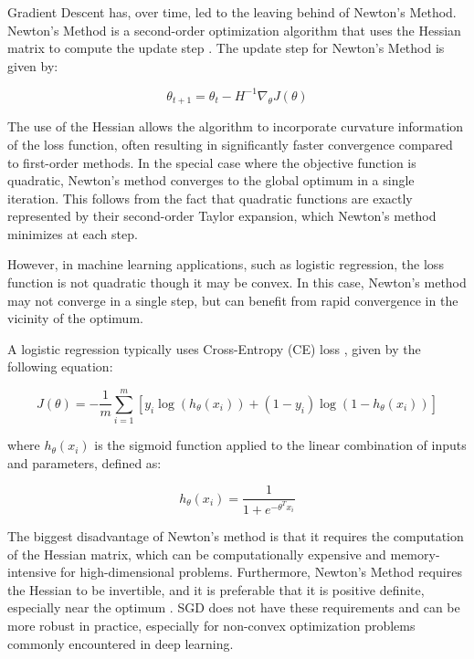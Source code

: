 \documentclass[conference]{IEEEtran}
\begin{document}
Gradient Descent has, over time, led to the leaving behind of Newton's Method. Newton's Method is a second-order optimization algorithm that uses the Hessian matrix to compute the update step \cite{POLYAK20071086}. The update step for Newton's Method is given by:

\begin{equation}
    \theta_{t+1} = \theta_t - H^{-1} \nabla_\theta J(\theta)
    \label{eq:newton}
\end{equation}

The use of the Hessian allows the algorithm to incorporate curvature information of the loss function, often resulting in significantly faster convergence compared to first-order methods. In the special case where the objective function is quadratic, Newton’s method converges to the global optimum in a single iteration. This follows from the fact that quadratic functions are exactly represented by their second-order Taylor expansion, which Newton’s method minimizes at each step.

However, in machine learning applications, such as logistic regression, the loss function is not quadratic though it may be convex. In this case, Newton's method may not converge in a single step, but can benefit from rapid convergence in the vicinity of the optimum.

A logistic regression typically uses Cross-Entropy (CE) loss \cite{mithra_noel_banerjee_amali_muthiah-nakarajan_2023}, given by the following equation:

\begin{equation}
    J(\theta) = -\frac{1}{m} \sum_{i=1}^{m} \left[ y_i \log(h_\theta(x_i)) + (1 - y_i) \log(1 - h_\theta(x_i)) \right]
    \label{eq:ce_loss}
\end{equation}

where \( h_\theta(x_i) \) is the sigmoid function applied to the linear combination of inputs and parameters, defined as:

\begin{equation}
    h_\theta(x_i) = \frac{1}{1 + e^{-\theta^T x_i}}
    \label{eq:sigmoid}
\end{equation}

The biggest disadvantage of Newton's method is that it requires the computation of the Hessian matrix, which can be computationally expensive and memory-intensive for high-dimensional problems. Furthermore, Newton's Method requires the Hessian to be invertible, and it is preferable that it is positive definite, especially near the optimum \cite{nocedal_springer_2006}. SGD does not have these requirements and can be more robust in practice, especially for non-convex optimization problems commonly encountered in deep learning.
\end{document}
